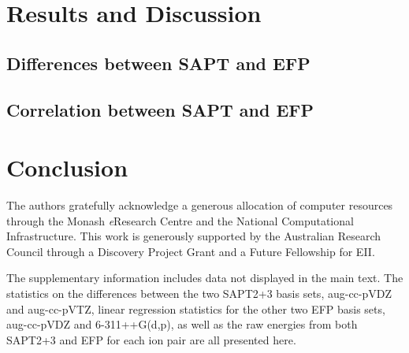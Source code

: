 \documentclass[journal=jctcce]{achemso}
\begin{document}
\section{Results and Discussion}
\label{sec:results}



\subsection{Differences between SAPT and EFP}
\label{subsec:comparison}


\subsection{Correlation between SAPT and EFP}
\label{subsec:corr-elst}




\section{Conclusion}
\label{sec:conclusion}


\begin{acknowledgement}
The authors gratefully acknowledge a generous allocation of computer resources through the Monash \emph{e}Research
Centre and the National Computational Infrastructure. This
work is generously supported by the Australian Research Council through a Discovery Project Grant and a Future Fellowship for EII.
\end{acknowledgement}

\begin{suppinfo}
    The supplementary information includes data not displayed in the main text.
    The statistics on the differences between the two SAPT2+3 basis sets, aug-cc-pVDZ and aug-cc-pVTZ, linear regression statistics for the other two EFP basis sets, aug-cc-pVDZ and 6-311++G(d,p), as well as the raw energies from both SAPT2+3 and EFP for each ion pair are all presented here.
\end{suppinfo}

%


\clearpage

\end{document}
